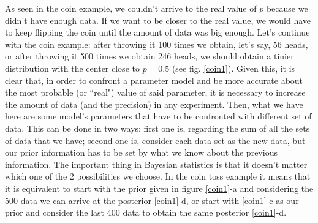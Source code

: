 \documentclass[onecolumn,           %
               showpacs,            %
               preprintnumbers,     %
               aps,                 %
               prl,          	    %
               letterpaper,             %
               superscriptaddress,      %
               nofootinbib,         %
               tightenlines,        %
               floats,floatfix      %
               ,usenatbib,
               ]{revtex4-1}
\begin{document}
As seen in the coin example, we couldn't arrive to the real value of $p$ because we didn't have enough data. If we want to be closer to the real value, we would have to keep flipping the coin until the amount of data was big enough. Let's continue with the coin example: after throwing it 100 times we obtain, let's say, 56 heads, or after throwing it 500 times we obtain 246 heads, we should obtain a tinier distribution with the center close to $p=0.5$ (see fig. \ref{coin1}). Given this, it is clear that, in order to confront a parameter model and be more accurate about the most probable (or ``real") value of said parameter, it is necessary to increase the amount of data (and the precision) in any experiment. 
Then, what we have here are some model's parameters that have to be confronted with different set of data. This can be done in two ways: first one is, regarding the sum of all the sets of data that we have; second one is, consider each data set as the new data, but our prior information has to be set by what we know about the previous information. The important thing in Bayesian statistics is that it doesn't matter which one of the 2 possibilities we choose. In the coin toss example it means that it is equivalent to start with the prior given in figure \ref{coin1}-a and considering the 500 data we can arrive at the posterior \ref{coin1}-d, or start with \ref{coin1}-c as our prior and consider the last 400 data to obtain the same posterior \ref{coin1}-d. \\ $ $ \\
\end{document}
